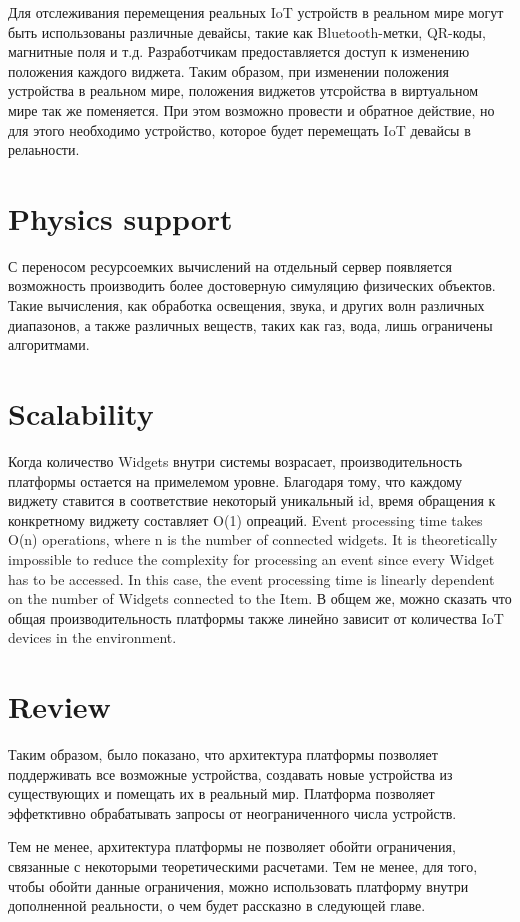 Для отслеживания перемещения реальных IoT устройств в реальном мире могут быть использованы различные девайсы, такие как Bluetooth-метки, QR-коды, магнитные поля и т.д. Разработчикам предоставляется доступ к изменению положения каждого виджета. Таким образом, при изменении положения устройства в реальном мире, положения виджетов утсройства в виртуальном мире так же поменяется. При этом возможно провести и обратное действие, но для этого необходимо устройство, которое будет перемещать IoT девайсы в релаьности.

\section{Physics support}

С переносом ресурсоемких вычислений на отдельный сервер появляется возможность производить более достоверную симуляцию физических объектов. Такие вычисления, как обработка освещения, звука, и других волн различных диапазонов, а также различных веществ, таких как газ, вода, лишь ограничены алгоритмами.

\section{Scalability}

Когда количество Widgets внутри системы возрасает, производительность платформы остается на примелемом уровне. Благодаря тому, что каждому виджету ставится в соответствие некоторый уникальный id, время обращения к конкретному виджету составляет O(1) опреаций. Event processing time takes O(n) operations, where n is the number of connected widgets. It is theoretically impossible to reduce the complexity for processing an event since every Widget has to be accessed. In this case, the event processing time is linearly dependent on the number of Widgets connected to the Item. В общем же, можно сказать что общая производительность платформы также линейно зависит от количества IoT devices in the environment.

\section{Review}
Таким образом, было показано, что архитектура платформы позволяет поддерживать все возможные устройства, создавать новые устройства из существующих и помещать их в реальный мир. Платформа позволяет эффетктивно обрабатывать запросы от неограниченного числа устройств.

Тем не менее, архитектура платформы не позволяет обойти ограничения, связанные с некоторыми теоретическими расчетами. Тем не менее, для того, чтобы обойти данные ограничения, можно использовать платформу внутри дополненной реальности, о чем будет рассказно в следующей главе.